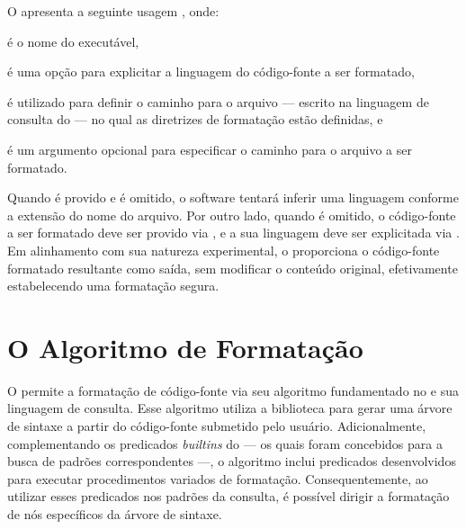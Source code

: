 \documentclass
  [11pt,a4paper,english,brazil,openright,sumario=tradicional,twoside]
  {abntex2}
\begin{document}
  O \witchcooking apresenta a seguinte usagem
  , onde:
  \begin{inparaenum}
    \item {} é o nome do executável,
    \item \codesnippetinline{[-l LANG]} é uma opção para explicitar a linguagem
          do código-fonte a ser formatado,
    \item {} é utilizado para definir o caminho para
          o arquivo --- escrito na linguagem de consulta do \treesitter{} ---
          no qual as diretrizes de formatação estão definidas, e
    \item \codesnippetinline{[SRC]} é um argumento opcional para especificar o
          caminho para o arquivo a ser formatado.
  \end{inparaenum}
  Quando \codesnippetinline{[SRC]} é provido e \codesnippetinline{[-l LANG]} é
  omitido, o software tentará inferir uma linguagem conforme a extensão do nome
  do arquivo. Por outro lado, quando \codesnippetinline{[SRC]} é omitido, o
  código-fonte a ser formatado deve ser provido via \textit{},
  e a sua linguagem deve ser explicitada via \codesnippetinline{[-l LANG]}. Em
  alinhamento com sua natureza experimental, o \witchcooking proporciona o
  código-fonte formatado resultante como saída, sem modificar o conteúdo
  original, efetivamente estabelecendo uma formatação segura.


  \section{O Algoritmo de Formatação}
  \label{section:fmt-algorithm}

  O \witchcooking permite a formatação de código-fonte via seu algoritmo
  fundamentado no \treesitter e sua linguagem de consulta. Esse algoritmo
  utiliza a biblioteca para gerar uma árvore de sintaxe a partir do
  código-fonte submetido pelo usuário. Adicionalmente, complementando os
  predicados \textit{builtins} do \treesitter{} --- os quais foram concebidos
  para a busca de padrões correspondentes ---, o algoritmo inclui predicados
  desenvolvidos para executar procedimentos variados de formatação.
  Consequentemente, ao utilizar esses predicados nos padrões da consulta, é
  possível dirigir a formatação de nós específicos da árvore de sintaxe.
\end{document}
